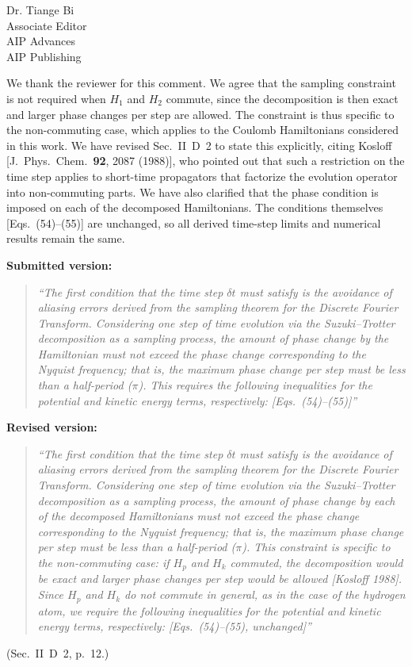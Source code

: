 \documentclass[11pt]{letter}
\begin{document}
\begin{letter}{Dr. Tiange Bi \\ Associate Editor \\ AIP Advances \\ AIP Publishing}
\begin{enumerate}
We thank the reviewer for this comment. We agree that the sampling constraint
is not required when $H_1$ and $H_2$ commute, since the decomposition is then
exact and larger phase changes per step are allowed. The constraint is thus
specific to the non-commuting case, which applies to the Coulomb Hamiltonians
considered in this work. We have revised Sec.~II~D~2 to state this
explicitly, citing Kosloff [J.~Phys.~Chem.\ \textbf{92}, 2087 (1988)], who
pointed out that such a restriction on the time step applies to short-time
propagators that factorize the evolution operator into non-commuting parts.
We have also clarified that the phase condition is imposed on each of the
decomposed Hamiltonians. The conditions themselves [Eqs.~(54)--(55)] are
unchanged, so all derived time-step limits and numerical results remain the
same.

\smallskip
\noindent\textbf{Submitted version:}
\begin{quote}
\itshape
``The first condition that the time step $\delta t$ must satisfy is the
avoidance of aliasing errors derived from the sampling theorem for the
Discrete Fourier Transform. Considering one step of time evolution via the
Suzuki--Trotter decomposition as a sampling process, the amount of phase
change by the Hamiltonian must not exceed the phase change corresponding to
the Nyquist frequency; that is, the maximum phase change per step must be
less than a half-period ($\pi$). This requires the following inequalities for
the potential and kinetic energy terms, respectively: [Eqs.~(54)--(55)]''
\end{quote}

\noindent\textbf{Revised version:}
\begin{quote}
\itshape
``The first condition that the time step $\delta t$ must satisfy is the
avoidance of aliasing errors derived from the sampling theorem for the
Discrete Fourier Transform. Considering one step of time evolution via the
Suzuki--Trotter decomposition as a sampling process, the amount of phase
change by each of the decomposed Hamiltonians must not exceed the phase change
corresponding to the Nyquist frequency; that is, the maximum phase change per
step must be less than a half-period ($\pi$). This constraint is specific to
the non-commuting case: if $H_p$ and $H_k$ commuted, the decomposition would
be exact and larger phase changes per step would be allowed [Kosloff 1988].
Since $H_p$ and $H_k$ do not commute in general, as in the case of the
hydrogen atom, we require the following inequalities for the potential and
kinetic energy terms, respectively: [Eqs.~(54)--(55), unchanged]''
\end{quote}
(Sec.~II~D~2, p.~12.)


\end{enumerate}
\end{letter}
\end{document}
